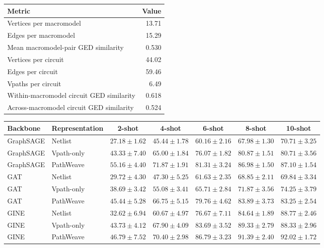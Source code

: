 
\begin{tabular}{lr}
\hline
Metric & Value \\
\hline
Vertices per macromodel & 13.71 \\
Edges per macromodel & 15.29 \\
Mean macromodel-pair GED similarity & 0.530 \\
Vertices per circuit & 44.02 \\
Edges per circuit & 59.46 \\
Vpaths per circuit & 6.49 \\
Within-macromodel circuit GED similarity & 0.618 \\
Across-macromodel circuit GED similarity & 0.524 \\
\hline
\end{tabular}

\begin{tabular}{llccccc}
\hline
Backbone & Representation & 2-shot & 4-shot & 6-shot & 8-shot & 10-shot \\
\hline
GraphSAGE & Netlist & $27.18 \pm 1.62$ & $45.44 \pm 1.78$ & $60.16 \pm 2.16$ & $67.98 \pm 1.30$ & $70.71 \pm 3.25$ \\
GraphSAGE & Vpath-only & $43.33 \pm 7.40$ & $65.00 \pm 1.84$ & $76.07 \pm 1.82$ & $80.87 \pm 1.51$ & $80.71 \pm 3.56$ \\
GraphSAGE & PathWeave & $55.16 \pm 4.40$ & $71.87 \pm 1.91$ & $81.31 \pm 3.24$ & $86.98 \pm 1.50$ & $87.10 \pm 1.54$ \\
GAT & Netlist & $29.72 \pm 4.30$ & $47.30 \pm 5.25$ & $61.63 \pm 2.35$ & $68.85 \pm 2.11$ & $69.84 \pm 3.34$ \\
GAT & Vpath-only & $38.69 \pm 3.42$ & $55.08 \pm 3.41$ & $65.71 \pm 2.84$ & $71.87 \pm 3.56$ & $74.25 \pm 3.79$ \\
GAT & PathWeave & $45.44 \pm 5.28$ & $66.75 \pm 5.15$ & $79.76 \pm 4.62$ & $83.89 \pm 3.73$ & $83.25 \pm 2.54$ \\
GINE & Netlist & $32.62 \pm 6.94$ & $60.67 \pm 4.97$ & $76.67 \pm 7.11$ & $84.64 \pm 1.89$ & $88.77 \pm 2.46$ \\
GINE & Vpath-only & $43.73 \pm 4.12$ & $67.90 \pm 4.09$ & $83.69 \pm 3.52$ & $89.33 \pm 2.79$ & $88.33 \pm 2.96$ \\
GINE & PathWeave & $46.79 \pm 7.52$ & $70.40 \pm 2.98$ & $86.79 \pm 3.23$ & $91.39 \pm 2.40$ & $92.02 \pm 1.72$ \\
\hline
\end{tabular}

